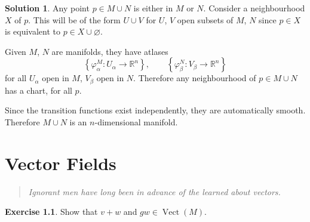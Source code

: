 \documentclass[11pt, a4paper]{report}
\theoremstyle{definition}
\newtheorem{exercise}{Exercise}[part]
\newtheorem{solution}{Solution}[part]
\newenvironment{ex}{\begin{exercise}}{\end{exercise}\pagebreak[1]}
\newenvironment{sol}{\begin{solution}}{\end{solution}\pagebreak[3]}
\newenvironment{epigraph}
    {\begin{quote}\small\itshape} %
    {\end{quote}\ignorespacesafterend\vspace{\parskip}}
\DeclareMathOperator{\Vect}{Vect}
\begin{document}
\begin{sol}

Any point $p \in M \cup N$ is either in $M$ or $N$. Consider a neighbourhood $X$ of $p$. This will be of the form $U \cup V$ for $U$, $V$ open subsets of $M$, $N$ since $p \in X$ is equivalent to $p \in X \cup \varnothing$.

Given $M$, $N$ are manifolds, they have atlases
\[
    \left\{\varphi^M_\alpha: U_\alpha \to \mathbb{R}^n \right\}, \qquad
    \left\{\varphi^N_\beta: V_\beta \to \mathbb{R}^n \right\}
\]
for all $U_\alpha$ open in $M$, $V_\beta$ open in $N$. Therefore any neighbourhood of $p \in M \cup N$ has a chart, for all $p$.

Since the transition functions exist independently, they are automatically smooth. Therefore $M \cup N$ is an $n$-dimensional manifold.

\end{sol}

\chapter{Vector Fields}\label{ch:vectorfields}

\begin{epigraph}
    Ignorant men have long been in advance of the learned about vectors.
\end{epigraph}

\begin{ex}

Show that $v + w$ and $gw \in \Vect(M)$.

\end{ex}
\end{document}
